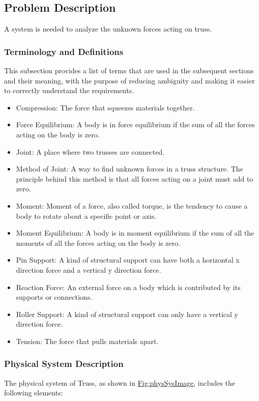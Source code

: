 \documentclass[12pt]{article}
\begin{document}
\subsection{Problem Description}
\label{Sec:ProbDesc}
A system is needed to analyze the unknown forces acting on truss.

\subsubsection{Terminology and Definitions}
\label{Sec:TermDefs}
This subsection provides a list of terms that are used in the subsequent sections and their meaning, with the purpose of reducing ambiguity and making it easier to correctly understand the requirements.

\begin{itemize}
\item{Compression: The force that squeezes materials together.}
\item{Force Equilibrium: A body is in force equilibrium if the sum of all the forces acting on the body is zero.}
\item{Joint: A place where two trusses are connected.}
\item{Method of Joint: A way to find unknown forces in a truss structure. The principle behind this method is that all forces acting on a joint must add to zero.}
\item{Moment: Moment of a force, also called torque, is the tendency to cause a body to rotate about a specific point or axis.}
\item{Moment Equilibrium: A body is in moment equilibrium if the sum of all the moments of all the forces acting on the body is zero.}
\item{Pin Support: A kind of structural support can have both a horizontal x direction force and a vertical y direction force.}
\item{Reaction Force: An external force on a body which is contributed by its supports or connections.}
\item{Roller Support: A kind of structural support can only have a vertical y direction force.}
\item{Tension: The force that pulls materials apart.}
\end{itemize}
\subsubsection{Physical System Description}
\label{Sec:PhysSyst}
The physical system of Truss, as shown in \hyperref[Figure:physSysImage]{Fig:physSysImage}, includes the following elements:
\end{document}
